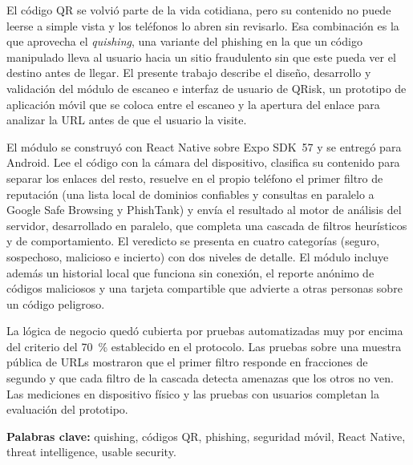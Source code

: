El código QR se volvió parte de la vida cotidiana, pero su contenido no puede leerse a simple vista y los teléfonos lo abren sin revisarlo. Esa combinación es la que aprovecha el \emph{quishing}, una variante del phishing en la que un código manipulado lleva al usuario hacia un sitio fraudulento sin que este pueda ver el destino antes de llegar. El presente trabajo describe el diseño, desarrollo y validación del módulo de escaneo e interfaz de usuario de QRisk, un prototipo de aplicación móvil que se coloca entre el escaneo y la apertura del enlace para analizar la URL antes de que el usuario la visite.

El módulo se construyó con React Native sobre Expo SDK~57 y se entregó para Android. Lee el código con la cámara del dispositivo, clasifica su contenido para separar los enlaces del resto, resuelve en el propio teléfono el primer filtro de reputación (una lista local de dominios confiables y consultas en paralelo a Google Safe Browsing y PhishTank) y envía el resultado al motor de análisis del servidor, desarrollado en paralelo, que completa una cascada de filtros heurísticos y de comportamiento. El veredicto se presenta en cuatro categorías (seguro, sospechoso, malicioso e incierto) con dos niveles de detalle. El módulo incluye además un historial local que funciona sin conexión, el reporte anónimo de códigos maliciosos y una tarjeta compartible que advierte a otras personas sobre un código peligroso.

La lógica de negocio quedó cubierta por pruebas automatizadas muy por encima del criterio del 70~\% establecido en el protocolo. Las pruebas sobre una muestra pública de URLs mostraron que el primer filtro responde en fracciones de segundo y que cada filtro de la cascada detecta amenazas que los otros no ven. Las mediciones en dispositivo físico y las pruebas con usuarios completan la evaluación del prototipo.

\vspace{1em}
\noindent\textbf{Palabras clave:} quishing, códigos QR, phishing, seguridad móvil, React Native, threat intelligence, usable security.


